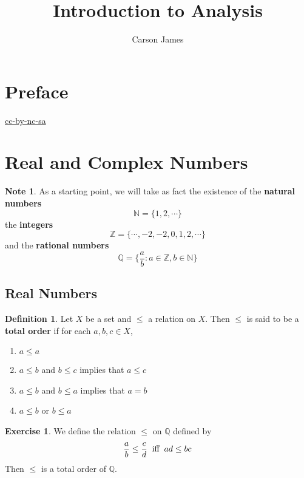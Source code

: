 \documentclass[12pt]{amsart}
\theoremstyle{definition}
\newtheorem{defn}[definition]{Definition}
\newtheorem{note}[definition]{Note}
\newtheorem{ex}[definition]{Exercise}
\newcommand{\N}{\mathbb{N}}
\newcommand{\Z}{\mathbb{Z}}
\newcommand{\Q}{\mathbb{Q}}
\begin{document}
	
	\title{Introduction to Analysis}
	\author{Carson James}
	\maketitle
	
	\tableofcontents
	
	\section*{Preface}
	\begin{flushleft}
		\href{https://creativecommons.org/licenses/by-nc-sa/4.0/legalcode.txt}{cc-by-nc-sa}
	\end{flushleft}

	
	
	\newpage
	

	\newpage
	
	\section{Real and Complex Numbers}
	\begin{note}
		As a starting point, we will take as fact the existence of the \textbf{natural numbers} $$\N = \{1, 2, \cdots\}$$ the \textbf{integers} $$\Z = \{\cdots, -2, -2, 0, 1, 2, \cdots\}$$ and the \textbf{rational numbers} $$\Q = \bigg \{\frac{a}{b}: a \in \Z, b \in \N \bigg \}$$
	\end{note}
	\subsection{Real Numbers}
	
	\begin{defn}
		Let $X$ be a set and $\leq$ a relation on $X$. Then $\leq$ is said to be a \textbf{total order} if for each $a,b,c \in X$,
		\begin{enumerate}
			\item $a \leq a$
			\item $a \leq b$ and $b \leq c$ implies that $a \leq  c$ 
			\item $a \leq b$ and $b \leq a$ implies that $a = b$ 
			\item $a \leq b$ or $b \leq a$
		\end{enumerate}
	\end{defn}

	\begin{ex}
		We define the relation $\leq$ on $\Q$ defined by $$\frac{a}{b} \leq \frac{c}{d} \hspace{.2cm} \text{iff} \hspace{.2cm} ad \leq bc$$ Then $\leq$ is a total order of $\Q$.
	\end{ex}
\end{document}
